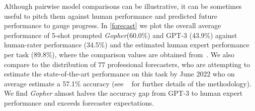 \documentclass[11pt, a4paper, logo, internal, copyright, nonumbering]{deepmind}
\newcommand{\gopher}{\textit{Gopher}\xspace}
\begin{document}
Although pairwise model comparisons can be illustrative, it can be sometimes useful to pitch them against human performance and predicted future performance to gauge progress. In \autoref{forecast} we plot the overall average performance of 5-shot prompted \gopher (60.0\%) and GPT-3 (43.9\%) against human-rater performance (34.5\%) and the estimated human expert performance per task (89.8\%), where the comparison values are obtained from~\citep{hendrycks2020measuring}. We also compare to the distribution of $77$ professional forecasters, who are attempting to estimate the state-of-the-art performance on this task by June 2022 who on average estimate a 57.1\% accuracy (see ~\citet{forecast_blog} for further details of the methodology). We find \gopher almost halves the accuracy gap from GPT-3 to human expert performance and exceeds forecaster expectations.
\end{document}
